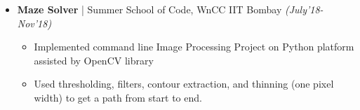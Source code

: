 \documentclass[a4paper,10pt]{article}
\newcommand{\isep}{-2 pt}
\begin{document}
\begin{itemize}
\vspace{-0.18cm}

\item \textbf{\large Maze Solver} | Summer School of Code, WnCC IIT Bombay \hfill \emph{(July'18-Nov'18)} \\
	\begin{itemize}\itemsep \isep
	
	\vspace{-0.70cm}
		\item Implemented command line Image Processing Project on Python platform assisted by OpenCV library
\item Used thresholding, filters, contour extraction, and thinning (one pixel width) to get a path from start to end.
	\end{itemize}


\end{itemize}
\end{document}
